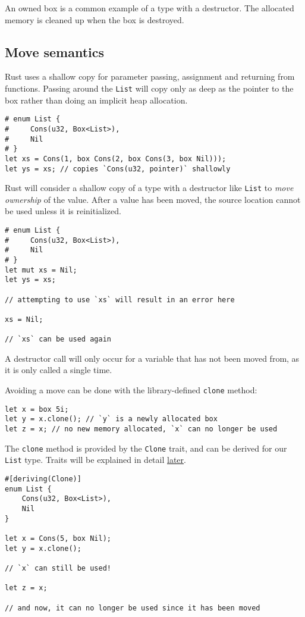 \documentclass[]{article}
\begin{document}
An owned box is a common example of a type with a destructor. The
allocated memory is cleaned up when the box is destroyed.

\subsection{Move semantics}\label{move-semantics}

Rust uses a shallow copy for parameter passing, assignment and returning
from functions. Passing around the \texttt{List} will copy only as deep
as the pointer to the box rather than doing an implicit heap allocation.

\begin{verbatim}
# enum List {
#     Cons(u32, Box<List>),
#     Nil
# }
let xs = Cons(1, box Cons(2, box Cons(3, box Nil)));
let ys = xs; // copies `Cons(u32, pointer)` shallowly
\end{verbatim}

Rust will consider a shallow copy of a type with a destructor like
\texttt{List} to \emph{move ownership} of the value. After a value has
been moved, the source location cannot be used unless it is
reinitialized.

\begin{verbatim}
# enum List {
#     Cons(u32, Box<List>),
#     Nil
# }
let mut xs = Nil;
let ys = xs;

// attempting to use `xs` will result in an error here

xs = Nil;

// `xs` can be used again
\end{verbatim}

A destructor call will only occur for a variable that has not been moved
from, as it is only called a single time.

Avoiding a move can be done with the library-defined \texttt{clone}
method:

\begin{verbatim}
let x = box 5i;
let y = x.clone(); // `y` is a newly allocated box
let z = x; // no new memory allocated, `x` can no longer be used
\end{verbatim}

The \texttt{clone} method is provided by the \texttt{Clone} trait, and
can be derived for our \texttt{List} type. Traits will be explained in
detail \hyperref[traits]{later}.

\begin{verbatim}
#[deriving(Clone)]
enum List {
    Cons(u32, Box<List>),
    Nil
}

let x = Cons(5, box Nil);
let y = x.clone();

// `x` can still be used!

let z = x;

// and now, it can no longer be used since it has been moved
\end{verbatim}
\end{document}
